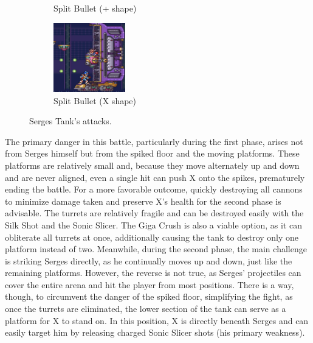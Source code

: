 \begin{figure}[htp]
\begin{subfigure}{.3\linewidth}
		\caption{Split Bullet (+ shape)}
	\end{subfigure}
	\begin{subfigure}{.3\linewidth}
		\centering
		\includegraphics[height=3cm]{figures/X2/Hunter_stages/Serges_tank_6.jpg}
		\caption{Split Bullet (X shape)}
	\end{subfigure}
	\caption{Serges Tank's attacks.}	
\end{figure}
The primary danger in this battle, particularly during the first phase, arises not from Serges himself but from the spiked floor and the moving platforms. These platforms are relatively small and, because they move alternately up and down and are never aligned, even a single hit can push X onto the spikes, prematurely ending the battle. For a more favorable outcome, quickly destroying all cannons to minimize damage taken and preserve X's health for the second phase is advisable. The turrets are relatively fragile and can be destroyed easily with the Silk Shot and the Sonic Slicer. The Giga Crush is also a viable option, as it can obliterate all turrets at once, additionally causing the tank to destroy only one platform instead of two. Meanwhile, during the second phase, the main challenge is striking Serges directly, as he continually moves up and down, just like the remaining platforms. However, the reverse is not true, as Serges' projectiles can cover the entire arena and hit the player from most positions. There is a way, though, to circumvent the danger of the spiked floor, simplifying the fight, as once the turrets are eliminated, the lower section of the tank can serve as a platform for X to stand on. In this position, X is directly beneath Serges and can easily target him by releasing charged Sonic Slicer shots (his primary weakness).

